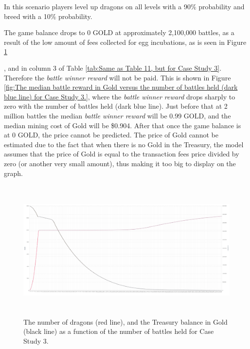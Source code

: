 \documentclass[12pt]{article}
\begin{document}
{%


In this scenario players level up dragons on all levels with a 90$\%$  probability and breed with a 10$\%$  probability.\par

The game balance drops to 0 GOLD at approximately 2,100,000 battles, as a result of the low amount of fees collected for egg incubations, as is seen in Figure \ref{fig:The number of dragons (red line), and the Treasury balance in Gold (black line) as a function of the number of battles held for Case Study 3.}}, and in column 3 of  Table \ref{tab:Same as Table 11, but for Case Study 3}. Therefore the \textit{battle winner reward} will not be paid. This is shown in Figure \ref{fig:The median battle reward in Gold versus the number of battles held (dark blue line) for Case Study 3.}, where the {\it battle winner reward} drops sharply to zero with the number of battles held (dark blue line). Just before that at 2 million battles the median {\it battle winner reward} will be 0.99 GOLD, and the median mining cost of Gold will be \$0.904.  After that once the game balance is at 0 GOLD, the price cannot be predicted. The price of Gold cannot be estimated due to the fact that when there is no Gold in the Treasury, the model assumes that the price of Gold is equal to the transaction fees price divided by zero (or another very small amount), thus making it too big to display on the graph.\par




\begin{figure}[H]
	\begin{Center}
		\includegraphics[width=6.27in,height=2.78in]{./media/CS3nimage17.png}
		\caption{The number of dragons (red line), and the Treasury balance in Gold (black line) as a function of the number of battles held for Case Study 3.}
		\label{fig:The number of dragons (red line), and the Treasury balance in Gold (black line) as a function of the number of battles held for Case Study 3.}
	\end{Center}
\end{figure}
\end{document}

